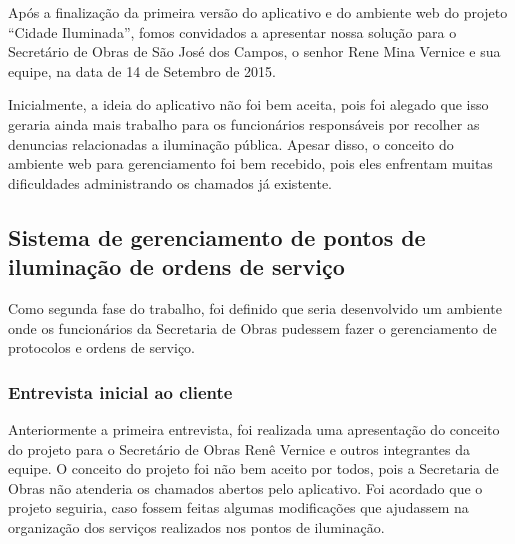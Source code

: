 \documentclass[
	article,			%
	11pt,				%
	oneside,			%
	a4paper,			%
	english,			%
	brazil,				%
	sumario=tradicional
	]{abntex2}
\begin{document}
Após a finalização da primeira versão do aplicativo e do ambiente web do
projeto “Cidade Iluminada”, fomos convidados a apresentar nossa solução para o
Secretário de Obras de São José dos Campos, o senhor Rene Mina Vernice e sua
equipe, na data de 14 de Setembro de 2015.

Inicialmente, a ideia do aplicativo não foi bem aceita, pois foi alegado que
isso geraria ainda mais trabalho para os funcionários responsáveis por
recolher as denuncias relacionadas a iluminação pública. Apesar disso, o
conceito do ambiente web para gerenciamento foi bem recebido, pois eles
enfrentam muitas dificuldades administrando os chamados já existente.

\subsection{Sistema de gerenciamento de pontos de iluminação de ordens de serviço}

Como segunda fase do trabalho, foi definido que seria desenvolvido um ambiente
onde os funcionários da Secretaria de Obras pudessem fazer o gerenciamento de
protocolos e ordens de serviço.

\subsubsection{Entrevista inicial ao cliente}

Anteriormente a primeira entrevista, foi realizada uma apresentação do conceito
do projeto para o Secretário de Obras Renê Vernice e outros integrantes da
equipe. O conceito do projeto foi não bem aceito por todos, pois a Secretaria
de Obras não atenderia os chamados abertos pelo aplicativo. Foi acordado que o
projeto seguiria, caso fossem feitas algumas modificações que ajudassem na
organização dos serviços realizados nos pontos de iluminação.
\end{document}
